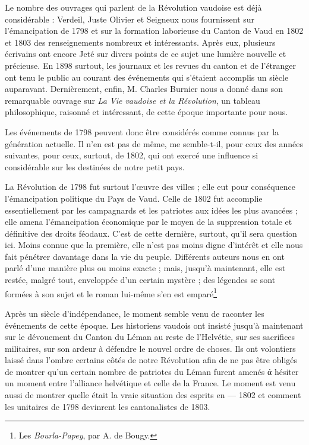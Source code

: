 \documentclass[french,twoside]{book} %
\newcommand\chaptercont{} %
\begin{document}
\chaptercont
\noindent Le nombre des ouvrages qui parlent de la Révolution vaudoise est déjà considérable : Verdeil, Juste Olivier et Seigneux nous fournissent sur l’émancipation de 1798 et sur la formation laborieuse du Canton de Vaud en 1802 et 1803 des renseignements nombreux et intéressants. Après eux, plusieurs écrivains ont encore Jeté sur divers points de ce sujet une lumière nouvelle et précieuse. En 1898 surtout, les journaux et les revues du canton et de l’étranger ont tenu le public au courant des événements qui s’étaient accomplis un siècle auparavant. Dernièrement, enfin, M. Charles Burnier nous a donné dans son remarquable ouvrage sur \emph{La Vie vaudoise et la Révolution}, un tableau philosophique, raisonné et intéressant, de cette époque importante pour nous.\par
Les événements de 1798 peuvent donc être considérés comme connus par la génération actuelle. Il n’en est pas de même, me semble-t-il, pour ceux des années suivantes, pour ceux, surtout, de 1802, qui ont exercé une influence si considérable sur les destinées de notre petit pays.\par
La Révolution de 1798 fut surtout l’œuvre des villes ; elle eut pour conséquence l’émancipation politique du Pays de Vaud. Celle de 1802 fut accomplie essentiellement par les campagnards et les patriotes aux idées les plus avancées ; elle amena l’émancipation économique par le moyen de la suppression totale et définitive des droits féodaux. C’est de cette dernière, surtout, qu’il sera question ici. Moins connue que la première, elle n’est pas moins digne d’intérêt et elle nous fait pénétrer davantage dans la vie du peuple. Différents auteurs nous en ont parlé d’une manière plus ou moins exacte ; mais, jusqu’à maintenant, elle est restée, malgré tout, enveloppée d’un certain mystère ; des légendes se sont formées à son sujet et le roman lui-même s’en est emparé\footnote{Les \emph{Bourla-Papey}, par A. de Bougy.} \par
Après un siècle d’indépendance, le moment semble venu de raconter les événements de cette époque. Les historiens vaudois ont insisté jusqu’à maintenant sur le dévouement du Canton du Léman au reste de l’Helvétie, sur ses sacrifices militaires, sur son ardeur à défendre le nouvel ordre de choses. Ils ont volontiers laissé dans l’ombre certains côtés de notre Révolution afin de ne pas être obligés de montrer qu’un certain nombre de patriotes du Léman furent amenés ά hésiter un moment entre l’alliance helvétique et celle de la France. Le moment est venu aussi de montrer quelle était la vraie situation des esprits en — 1802 et comment les unitaires de 1798 devinrent les cantonalistes de 1803.\par
\end{document}
